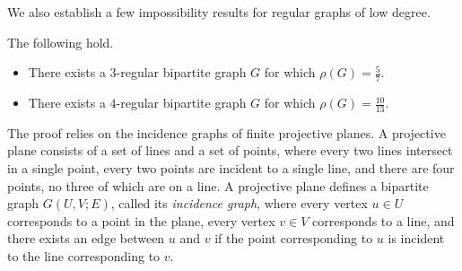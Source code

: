 %
%
%
%

%
%
%
%

%
%
%
%
%
%
%

We also establish a few impossibility results for regular graphs of low degree.

\begin{theorem}
	The following hold.  %
	\begin{itemize}
		\item There exists a $3$-regular bipartite graph $G$ for which $\rho(G) = \frac{5}{7}$.
		\item There exists a $4$-regular bipartite graph $G$ for which $\rho(G) = \frac{10}{13}$.
	\end{itemize}
	\label{thm:imposs-projective}
\end{theorem}

%
%
%
The proof relies on %
the incidence graphs of finite  %
projective planes.
A projective plane consists of a set of lines and a set of points, where
%
every two lines intersect in a single point, %
every two points are incident to a single line,
and there are four points, no three of which are on a line.  %
A projective plane %
defines %
a bipartite graph $G(U,V;E)$,
called its \emph{incidence graph},  %
where every vertex $u \in U$ corresponds to a point in the plane, every vertex $v \in V$ corresponds to a line, and there exists an edge between $u$ and $v$ if the point corresponding to $u$ is incident to the line corresponding to $v$.

